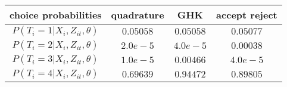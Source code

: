 \begin{tabular}{cccc}
\toprule
choice probabilities & quadrature & GHK & accept reject\\
\toprule
$P\left(T_i = 1 | X_{i}, Z_{it}, \theta \right)$ & $0.05058$ & $0.05058$ & $0.05077$\\
$P\left(T_i = 2 | X_{i}, Z_{it}, \theta \right)$ & $2.0e-5$ & $4.0e-5$ & $0.00038$\\
$P\left(T_i = 3 | X_{i}, Z_{it}, \theta \right)$ & $1.0e-5$ & $0.00466$ & $4.0e-5$\\
$P\left(T_i = 4 | X_{i}, Z_{it}, \theta \right)$ & $0.69639$ & $0.94472$ & $0.89805$\\
\toprule
\end{tabular}